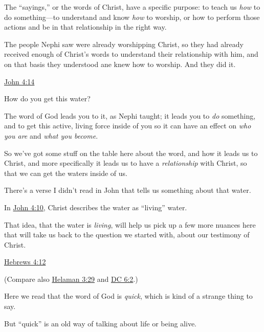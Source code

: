 \begin{compactitem}
\begin{compactitem}
\begin{compactitem}
							\item The ``sayings,'' or the words of Christ, have a specific purpose: to teach us \textit{how} to do something---to understand and know \textit{how} to worship, or how to perform those actions and be in that relationship in the right way.
							\item The people Nephi saw were already worshipping Christ, so they had already received enough of Christ's words to understand their relationship with him, and on that basis they understood ane knew how to worship. And they did it.
						\end{compactitem}
					\item \hyperref[JOHN-4-14]{John 4:14}
						\begin{compactitem}
							\item How do you get this water?
							\item The word of God leads you to it, as Nephi taught; it leads you to \textit{do} something, and to get this active, living force inside of you so it can have an effect on \textit{who you are} and \textit{what you become}.
						\end{compactitem}
					\item So we've got some stuff on the table here about the word, and how it leads us to Christ, and more specifically it leads us to have a \textit{relationship} with Christ, so that we can get the waters inside of us.
						\begin{compactitem}
							\item There's a verse I didn't read in John that tells us something about that water.
							\item In \hyperref[JOHN-4-10]{John 4:10}, Christ describes the water as ``living'' water.
							\item That idea, that the water is \textit{living}, will help us pick up a few more nuances here that will take us back to the question we started with, about our testimony of Christ.
						\end{compactitem}
					\item \hyperref[HEBREWS-4-12]{Hebrews 4:12}
						\begin{compactitem}
							\item (Compare also \hyperref[HELAMAN-3-29]{Helaman 3:29} and \hyperref[DC6-2]{DC 6:2}.)
							\item Here we read that the word of God is \textit{quick}, which is kind of a strange thing to say.
							\item But ``quick'' is an old way of talking about life or being alive.

\end{compactitem}
\end{compactitem}
\end{compactitem}
